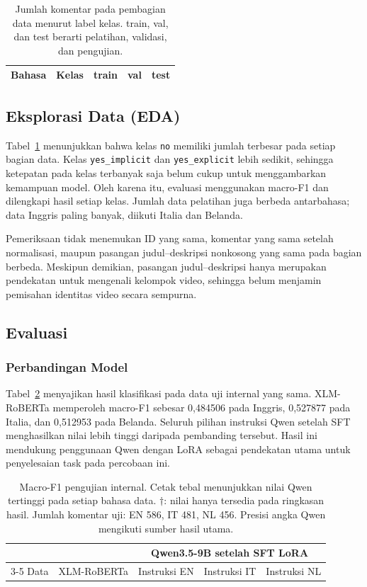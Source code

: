 \documentclass[11pt]{article}
\begin{document}
\begin{table}[t]
\centering
\small
\setlength{\tabcolsep}{3pt}
\begin{tabular}{llrrr}
\toprule
Bahasa & Kelas & train & val & test \\
\midrule

\end{tabular}
\caption{Jumlah komentar pada pembagian data menurut label kelas. train, val, dan test berarti pelatihan, validasi, dan pengujian.}
\label{tab:data}
\end{table}

\subsection{Eksplorasi Data (EDA)}
Tabel~\ref{tab:data} menunjukkan bahwa kelas \texttt{no} memiliki jumlah terbesar pada setiap bagian data. Kelas \texttt{yes\_implicit} dan \texttt{yes\_explicit} lebih sedikit, sehingga ketepatan pada kelas terbanyak saja belum cukup untuk menggambarkan kemampuan model. Oleh karena itu, evaluasi menggunakan macro-F1 dan dilengkapi hasil setiap kelas. Jumlah data pelatihan juga berbeda antarbahasa; data Inggris paling banyak, diikuti Italia dan Belanda.

Pemeriksaan tidak menemukan ID yang sama, komentar yang sama setelah normalisasi, maupun pasangan judul--deskripsi nonkosong yang sama pada bagian berbeda. Meskipun demikian, pasangan judul--deskripsi hanya merupakan pendekatan untuk mengenali kelompok video, sehingga belum menjamin pemisahan identitas video secara sempurna.

\subsection{Evaluasi}
\subsubsection{Perbandingan Model}
Tabel~\ref{tab:main} menyajikan hasil klasifikasi pada data uji internal yang sama. XLM-RoBERTa memperoleh macro-F1 sebesar 0,484506 pada Inggris, 0,527877 pada Italia, dan 0,512953 pada Belanda. Seluruh pilihan instruksi Qwen setelah SFT menghasilkan nilai lebih tinggi daripada pembanding tersebut. Hasil ini mendukung penggunaan Qwen dengan LoRA sebagai pendekatan utama untuk penyelesaian task pada percobaan ini.

\begin{table}[t]
\centering
\begin{tabular}{lrrrr}
\toprule
& & \multicolumn{3}{c}{Qwen3.5-9B setelah SFT LoRA} \\
\cmidrule(lr){3-5}
Data & XLM-RoBERTa & Instruksi EN & Instruksi IT & Instruksi NL \\
\midrule

\end{tabular}
\caption{Macro-F1 pengujian internal. Cetak tebal menunjukkan nilai Qwen tertinggi pada setiap bahasa data. $\dagger$: nilai hanya tersedia pada ringkasan hasil. Jumlah komentar uji: EN 586, IT 481, NL 456. Presisi angka Qwen mengikuti sumber hasil utama.}
\label{tab:main}
\end{table}
\end{document}
